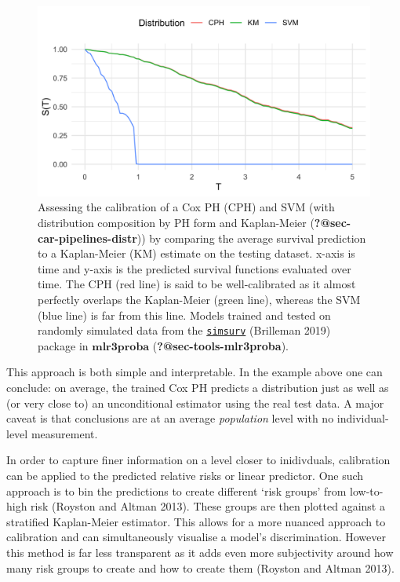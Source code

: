 \documentclass[
  letterpaper,
]{scrbook}
\theoremstyle{plain}
\theoremstyle{definition}
\theoremstyle{remark}
\begin{document}
\begin{figure}

{\centering \includegraphics{./images/evaluation/calib_km.png}

}

\caption{\label{fig-eval-calib-km}Assessing the calibration of a Cox PH
(CPH) and SVM (with distribution composition by PH form and Kaplan-Meier
(\textbf{?@sec-car-pipelines-distr})) by comparing the average survival
prediction to a Kaplan-Meier (KM) estimate on the testing dataset.
x-axis is time and y-axis is the predicted survival functions evaluated
over time. The CPH (red line) is said to be well-calibrated as it almost
perfectly overlaps the Kaplan-Meier (green line), whereas the SVM (blue
line) is far from this line. Models trained and tested on randomly
simulated data from the
\href{https://cran.r-project.org/package=simsurv}{\texttt{simsurv}}
(Brilleman 2019) package in \(\textbf{mlr3proba}\)
(\textbf{?@sec-tools-mlr3proba}).}

\end{figure}

This approach is both simple and interpretable. In the example above one
can conclude: on average, the trained Cox PH predicts a distribution
just as well as (or very close to) an unconditional estimator using the
real test data. A major caveat is that conclusions are at an average
\emph{population} level with no individual-level measurement.

In order to capture finer information on a level closer to inidivduals,
calibration can be applied to the predicted relative risks or linear
predictor. One such approach is to bin the predictions to create
different `risk groups' from low-to-high risk (Royston and Altman 2013).
These groups are then plotted against a stratified Kaplan-Meier
estimator. This allows for a more nuanced approach to calibration and
can simultaneously visualise a model's discrimination. However this
method is far less transparent as it adds even more subjectivity around
how many risk groups to create and how to create them (Royston and
Altman 2013).
\end{document}
